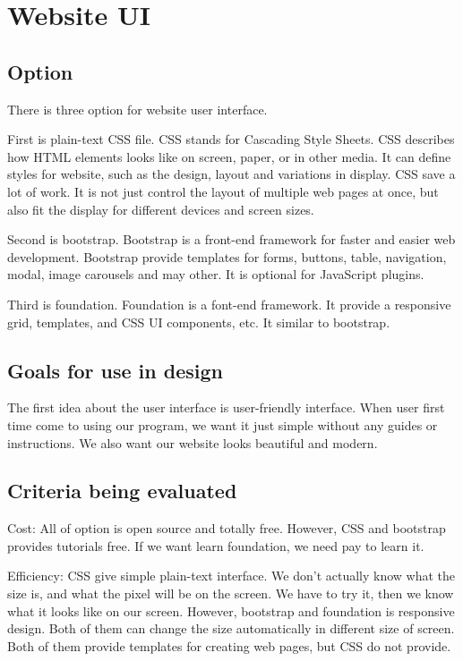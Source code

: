 \section{Website UI}

\subsection{Option}
There is three option for website user interface.
 
First is plain-text CSS file. CSS stands for Cascading Style Sheets. CSS describes how HTML elements looks like on screen, paper, or in other media. It can define styles for website, such as the design, layout and variations in display. CSS save a lot of work. It is not just control the layout of multiple web pages at once, but also fit the display for different devices and screen sizes.\cite{CSS_intro}

Second is bootstrap. Bootstrap is a front-end framework for faster and easier web development. Bootstrap provide templates for forms, buttons, table, navigation, modal, image carousels and may other. It is optional for JavaScript plugins. \cite{boot_intro}

Third is foundation. Foundation is a font-end framework. It provide a responsive grid, templates, and CSS UI components, etc. It similar to bootstrap. \cite{foundation_intro}


\subsection{Goals for use in design}
The first idea about the user interface is user-friendly interface. When user first time come to using our program, we want it just simple without any guides or instructions. We also want our website looks beautiful and modern. 

\subsection{Criteria being evaluated}
Cost: All of option is open source and totally free. However, CSS and bootstrap provides tutorials free. If we want learn foundation, we need pay to learn it.

Efficiency: CSS give simple plain-text interface. We don't actually know what the size is, and what the pixel will be on the screen. We have to try it, then we know what it looks like on our screen. However, bootstrap and foundation is responsive design. Both of them can change the size automatically in different size of screen.
Both of them provide templates for creating web pages, but CSS do not provide.

